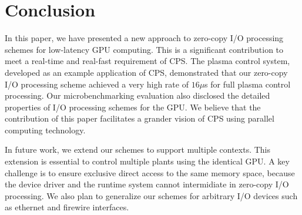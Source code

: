 \section{Conclusion}
\label{sec:conclusion}

In this paper, we have presented a new approach to zero-copy I/O
processing schemes for low-latency GPU computing.
This is a significant contribution to meet a real-time and real-fast
requirement of CPS.
The plasma control system, developed as an example application of CPS,
demonstrated that our zero-copy I/O processing scheme achieved a very
high rate of $16\mu$s for full plasma control processing.
Our microbenchmarking evaluation also disclosed the detailed properties
of I/O processing schemes for the GPU.
We believe that the contribution of this paper facilitates a grander
vision of CPS using parallel computing technology.

In future work, we extend our schemes to support multiple contexts.
This extension is essential to control multiple plants using the
identical GPU.
A key challenge is to ensure exclusive direct access to the same memory
space, because the device driver and the runtime system cannot
intermidiate in zero-copy I/O processing.
We also plan to generalize our schemes for arbitrary I/O devices such as
ethernet and firewire interfaces.